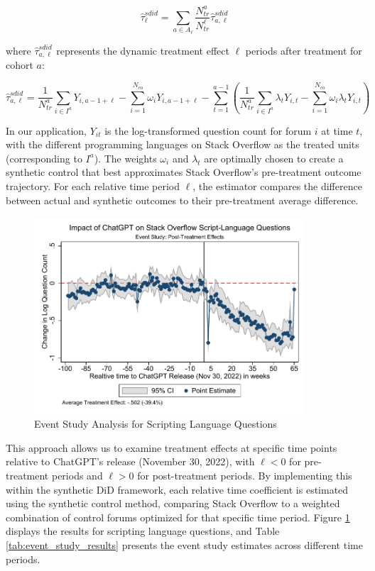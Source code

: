 \begin{equation}
    \hat{\tau}^{sdid}_{\ell} = \sum_{a \in A_{\ell}} \frac{N^a_{tr}}{N^{\ell}_{tr}} \hat{\tau}^{sdid}_{a,\ell}
\end{equation}

where $\hat{\tau}^{sdid}_{a,\ell}$ represents the dynamic treatment effect $\ell$ periods after treatment for cohort $a$:

\begin{equation}
    \hat{\tau}^{sdid}_{a,\ell} = \frac{1}{N^a_{tr}} \sum_{i \in I^a} Y_{i,a-1+\ell} - \sum_{i=1}^{N_{co}} \omega_i Y_{i,a-1+\ell} - \sum_{t=1}^{a-1} \left( \frac{1}{N^a_{tr}} \sum_{i \in I^a} \lambda_t Y_{i,t} - \sum_{i=1}^{N_{co}} \omega_i \lambda_t Y_{i,t} \right)
\end{equation}

In our application, $Y_{it}$ is the log-transformed question count for forum $i$ at time $t$, with the different programming languages on Stack Overflow as the treated units (corresponding to $I^a$). The weights $\omega_i$ and $\lambda_t$ are optimally chosen to create a synthetic control that best approximates Stack Overflow's pre-treatment outcome trajectory. For each relative time period $\ell$, the estimator compares the difference between actual and synthetic outcomes to their pre-treatment average difference.

\begin{figure}[H]
    \centering
    \includegraphics[width=0.9\textwidth]{imgs/stata/event_study_scripting_languages.pdf}
    \caption{Event Study Analysis for Scripting Language Questions}
    \label{fig:event_study}
\end{figure}


This approach allows us to examine treatment effects at specific time points relative to ChatGPT's release (November 30, 2022), with $\ell < 0$ for pre-treatment periods and $\ell > 0$ for post-treatment periods. By implementing this within the synthetic DiD framework, each relative time coefficient is estimated using the synthetic control method, comparing Stack Overflow to a weighted combination of control forums optimized for that specific time period. Figure \ref{fig:event_study} displays the results for scripting language questions, and Table \ref{tab:event_study_results} presents the event study estimates across different time periods.

